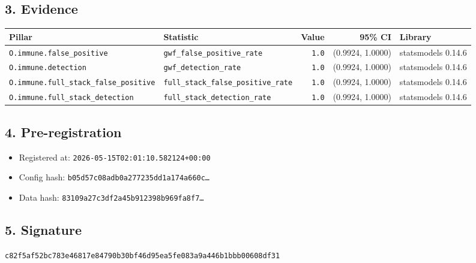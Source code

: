 \documentclass{article}
\begin{document}
\subsection*{3. Evidence}
\begin{tabular}{llrrl}\toprule
\textbf{Pillar} & \textbf{Statistic} & \textbf{Value} & \textbf{95\% CI} & \textbf{Library} \\\midrule
\texttt{O.immune.false\_positive} & \texttt{gwf\_false\_positive\_rate} & \texttt{1.0} & (0.9924, 1.0000) & statsmodels 0.14.6 \\
\texttt{O.immune.detection} & \texttt{gwf\_detection\_rate} & \texttt{1.0} & (0.9924, 1.0000) & statsmodels 0.14.6 \\
\texttt{O.immune.full\_stack\_false\_positive} & \texttt{full\_stack\_false\_positive\_rate} & \texttt{1.0} & (0.9924, 1.0000) & statsmodels 0.14.6 \\
\texttt{O.immune.full\_stack\_detection} & \texttt{full\_stack\_detection\_rate} & \texttt{1.0} & (0.9924, 1.0000) & statsmodels 0.14.6 \\
\bottomrule\end{tabular}
\subsection*{4. Pre-registration}
\begin{itemize}
\item Registered at: \texttt{2026-05-15T02:01:10.582124+00:00}
\item Config hash: \texttt{b05d57c08adb0a277235dd1a174a660c\dots}
\item Data hash: \texttt{83109a27c3df2a45b912398b969fa8f7\dots}
\end{itemize}
\subsection*{5. Signature}
\texttt{c82f5af52bc783e46817e84790b30bf46d95ea5fe083a9a446b1bbb00608df31}\\
\end{document}
